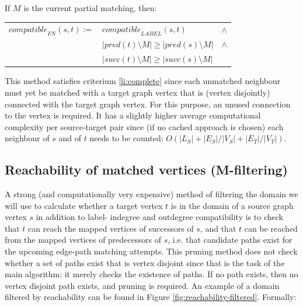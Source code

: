 \begin{minipage}{\textwidth}
\begin{defn} If $M$ is the current partial matching, then:


\begin{center}
\bgroup
\def\arraystretch{1.2}
\setlength\tabcolsep{5pt}
\begin{tabular}{lll}
\centering
$\mathit{compatible}_{\mathit{FN}}(s,t) := $&$\mathit{compatible}_{\mathit{LABEL}}(s,t)$&$\land$\\
&$ |\mathit{pred}(t) \setminus M| \geq |\mathit{pred}(s) \setminus M|$&$\land$\\
&$ |\mathit{succ}(t) \setminus M| \geq |\mathit{succ}(s) \setminus M|$
\end{tabular}
\egroup
\end{center}
 
\end{defn}
\end{minipage}

This method satisfies criterium \ref{li:complete} since each unmatched neighbour must yet be matched with a target graph vertex that is (vertex disjointly) connected with the target graph vertex. For this purpose, an unused connection to the vertex is required. It has a slightly higher average computational complexity per source-target pair since (if no cached approach is chosen) each neighbour of $s$ and of $t$ needs to be counted: $O(|L_S| + |E_S|/|V_S| + |E_T|/|V_T|)$.


\subsection{Reachability of matched vertices (M-filtering)}
A strong (and computationally very expensive) method of filtering the domain we will use to calculate whether a target vertex $t$ is in the domain of a source graph vertex $s$ in addition to label- indegree and outdegree compatibility is to check that $t$ can reach the mapped vertices of successors of $s$, and that $t$ can be reached from the mapped vertices of predecessors of $s$, i.e. that candidate paths exist for the upcoming edge-path matching attempts. This pruning method does not check whether a set of paths exist that is vertex disjoint since that is the task of the main algorithm: it merely checks the existence of paths. If no path exists, then no vertex disjoint path exists, and pruning is required. An example of a domain filtered by reachability can be found in Figure \ref{fig:reachability-filtered}. Formally:

